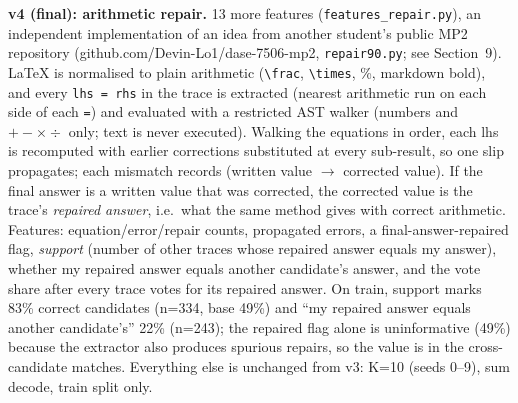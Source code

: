 \documentclass[10pt,a4paper]{article}
\begin{document}
\textbf{v4 (final): arithmetic repair.} 13 more features (\texttt{features\_repair.py}), an independent implementation of an idea from another student's public MP2 repository (github.com/Devin-Lo1/dase-7506-mp2, \texttt{repair90.py}; see Section~9). LaTeX is normalised to plain arithmetic (\verb|\frac|, \verb|\times|, \%, markdown bold), and every \verb|lhs = rhs| in the trace is extracted (nearest arithmetic run on each side of each \verb|=|) and evaluated with a restricted AST walker (numbers and $+-\times\div$ only; text is never executed). Walking the equations in order, each lhs is recomputed with earlier corrections substituted at every sub-result, so one slip propagates; each mismatch records (written value $\to$ corrected value). If the final answer is a written value that was corrected, the corrected value is the trace's \emph{repaired answer}, i.e.\ what the same method gives with correct arithmetic. Features: equation/error/repair counts, propagated errors, a final-answer-repaired flag, \emph{support} (number of other traces whose repaired answer equals my answer), whether my repaired answer equals another candidate's answer, and the vote share after every trace votes for its repaired answer. On train, support marks 83\% correct candidates (n=334, base 49\%) and ``my repaired answer equals another candidate's'' 22\% (n=243); the repaired flag alone is uninformative (49\%) because the extractor also produces spurious repairs, so the value is in the cross-candidate matches. Everything else is unchanged from v3: K=10 (seeds 0--9), sum decode, train split only.
\end{document}
